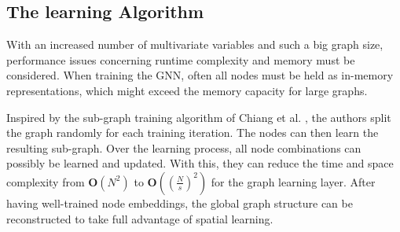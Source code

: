 \documentclass[letterpaper, twocolumn,11pt]{article}
\begin{document}
    \subsection{The learning Algorithm}
    With an increased number of multivariate variables and such a big graph size,
    performance issues concerning runtime complexity and memory must be considered.
    When training the GNN, often all nodes must be held as in-memory representations, which might exceed the memory capacity for large graphs.

    Inspired by the sub-graph training algorithm of Chiang et al. \cite{chiang2019cluster}, the authors split the graph
    randomly for each training iteration.
    The nodes can then learn the resulting sub-graph.
    Over the learning process, all node combinations can possibly be learned and updated.
    With this, they can reduce the time and space complexity from $\mathbf{O}(N^2)$ to $\mathbf{O}\left((\frac{N}{s})^2\right)$ for the graph learning layer.
    After having well-trained node embeddings, the global graph structure can be reconstructed to take full advantage of spatial learning.
\end{document}
